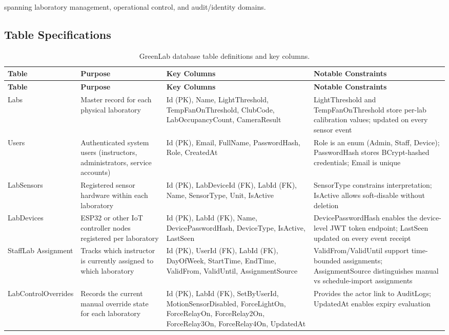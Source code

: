 spanning laboratory management, operational control, and audit/identity domains.


\subsection{Table Specifications}
\begin{longtable}{|L{2.5cm}|L{3.0cm}|L{5.0cm}|L{3.5cm}|}
\caption{GreenLab database table definitions and key columns.} \label{tab:4-4} \\
\hline
{}
\textbf{Table} & \textbf{Purpose} & \textbf{Key Columns} & \textbf{Notable Constraints} \\
\hline
\endfirsthead
\hline
{}
\textbf{Table} & \textbf{Purpose} & \textbf{Key Columns} & \textbf{Notable Constraints} \\
\hline
\endhead
\hline
\endfoot
\hline
\endlastfoot
Labs & Master record for each physical laboratory & Id (PK), Name, LightThreshold, TempFanOnThreshold, ClubCode, LabOccupancyCount, CameraResult & LightThreshold and TempFanOnThreshold store per-lab calibration values; updated on every sensor event \\
\hline
Users & Authenticated system users (instructors, administrators, service accounts) & Id (PK), Email, FullName, PasswordHash, Role, CreatedAt & Role is an enum (Admin, Staff, Device); PasswordHash stores BCrypt-hashed credentials; Email is unique \\
\hline
LabSensors & Registered sensor hardware within each laboratory & Id (PK), LabDeviceId (FK), LabId (FK), Name, SensorType, Unit, IsActive & SensorType constrains interpretation; IsActive allows soft-disable without deletion \\
\hline
LabDevices & ESP32 or other IoT controller nodes registered per laboratory & Id (PK), LabId (FK), Name, DevicePasswordHash, DeviceType, IsActive, LastSeen & DevicePasswordHash enables the device-level JWT token endpoint; LastSeen updated on every event receipt \\
\hline
StaffLab \newline Assignment & Tracks which instructor is currently assigned to which laboratory & Id (PK), UserId (FK), LabId (FK), DayOfWeek, StartTime, EndTime, ValidFrom, ValidUntil, AssignmentSource & ValidFrom/ValidUntil support time-bounded assignments; AssignmentSource distinguishes manual vs schedule-import assignments \\
\hline
LabControl\newline Overrides & Records the current manual override state for each laboratory & Id (PK), LabId (FK), SetByUserId, MotionSensorDisabled, ForceLightOn, ForceRelayOn, ForceRelay2On, ForceRelay3On, ForceRelay4On, UpdatedAt & Provides the actor link to AuditLogs; UpdatedAt enables expiry evaluation \\

\end{longtable}
